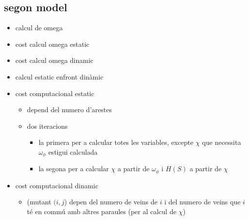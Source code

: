 \subsection{segon model}
\begin{itemize}
\item calcul de omega
\item cost calcul omega estatic
\item cost calcul omega dinamic
\item calcul estatic enfront dinàmic
\item cost computacional estatic
  \begin{itemize}
  \item depend del numero d'arestes
  \item dos iteracions
    \begin{itemize}
    \item la primera per a calcular totes les variables, excepte $\chi$ que necessita $\omega_\phi$ estigui calculada
    \item la segona per a calcular $\chi$ a partir de $\omega_\phi$ i $H(S)$ a partir de $\chi$
    \end{itemize}
  \end{itemize}
\item cost computacional dinamic
  \begin{itemize}
  \item (mutant $(i,j$) depen del numero de veins de $i$ i del numero de veins que $i$ té en commú amb altres paraules (per al calcul de $\chi$)
  \end{itemize}
\end{itemize}


